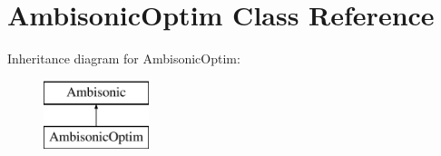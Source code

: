 \hypertarget{class_ambisonic_optim}{\section{Ambisonic\-Optim Class Reference}
\label{class_ambisonic_optim}
}
Inheritance diagram for Ambisonic\-Optim\-:\begin{figure}[H]
\begin{center}
\leavevmode
\includegraphics[height=2.000000cm]{class_ambisonic_optim}
\end{center}
\end{figure}
